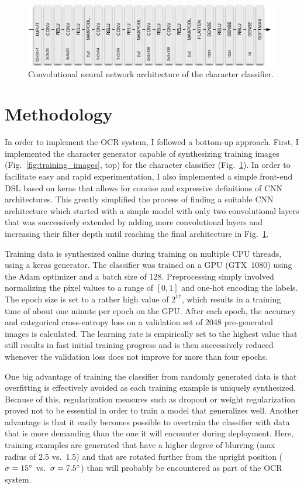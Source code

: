 \documentclass[12pt]{article}
\newcommand\figref[1]{Fig.~\ref{fig:#1}}
\begin{document}
\begin{figure}[ht]
  \centering
  \includegraphics[scale=0.75]{fig/Classifier_CNN}
  \caption
  {
    Convolutional neural network architecture of the character classifier.
  }
  \label{fig:classifier_cnn}
\end{figure}


\section{Methodology}
In order to implement the OCR system, I followed a bottom-up approach. First, I implemented
the character generator capable of synthesizing training images (\figref{training_images}, top)
for the character classifier (\figref{classifier_cnn}). In order to facilitate easy and rapid
experimentation, I also implemented a simple front-end DSL based on keras \cite{KerasDoc40:online} that allows
for concise and expressive definitions of CNN architectures. This greatly simplified the
process of finding a suitable CNN architecture which started with a simple model with only
two convolutional layers that was successively extended by adding more convolutional layers
and increasing their filter depth until reaching the final architecture in \figref{classifier_cnn}.

Training data is synthesized online during training on multiple CPU threads, using a keras generator. The classifier was trained
on a GPU (GTX~1080) using the Adam optimizer \cite{Kingma2014} and a batch size of 128.
Preprocessing simply involved normalizing the pixel values to a range of $[0, 1]$ and one-hot encoding
the labels. The epoch size is set to a rather high value of $2^{17}$,
which results in a training time of about one minute per epoch on the GPU.
After each epoch, the accuracy and categorical cross-entropy loss on a validation set of
2048 pre-generated images is calculated.
The learning rate is empirically set to the highest value that still results in fast initial training progress and is then
successively reduced whenever the validation loss does not improve for more than four epochs.

One big advantage of training the classifier from randomly generated data is that overfitting
is effectively avoided as each training example is uniquely synthesized. Because of this,
regularization measures such as dropout \cite{Srivastava2014} or weight regularization proved not to be essential
in order to train a model that generalizes well. Another advantage is that it easily becomes
possible to overtrain the classifier with data that is more demanding than the one it will
encounter during deployment. Here, training examples are generated that have a higher degree
of blurring (max radius of 2.5 vs.\ 1.5) and that are rotated further from the upright position
($\sigma=15\degree$ vs.\ $\sigma=7.5\degree$)
than will probably be encountered as part of the OCR system.
\end{document}
